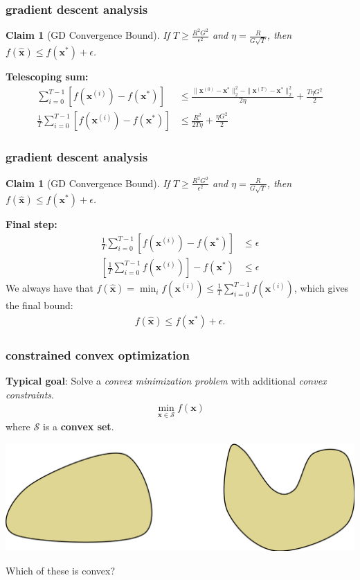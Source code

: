 \documentclass[compress]{beamer}
\newcommand{\bv}[1]{\mathbf{#1}}
\newtheorem{claim}[theorem]{Claim}
\begin{document}
\begin{frame}[t]
	\frametitle{gradient descent analysis}
	\small
	\begin{claim}[GD Convergence Bound]
	If $T \geq \frac{R^2G^2}{\epsilon^2}$ and $\eta = \frac{R}{G\sqrt{T}}$, then $f(\bv{\hat{x}}) \leq f(\bv{x}^*) + \epsilon$.
	\end{claim}
\textbf{Telescoping sum:}
\begin{align*}
	\sum_{i=0}^{T-1}\left[f(\bv{x}^{(i)}) - f(\bv{x}^*)\right] &\leq \frac{\|\bv{x}^{(0)} - \bv{x}^*\|_2^2 - \|\bv{x}^{(T)} - \bv{x}^*\|_2^2}{2\eta} + \frac{T\eta G^2}{2}\\
	\frac{1}{T}\sum_{i=0}^{T-1}\left[f(\bv{x}^{(i)}) - f(\bv{x}^*)\right] &\leq \frac{R^2}{2T\eta} + \frac{\eta G^2}{2}
\end{align*}
\end{frame}
\begin{frame}[t]
	\frametitle{gradient descent analysis}
	\begin{claim}[GD Convergence Bound]
		If $T \geq \frac{R^2G^2}{\epsilon^2}$ and $\eta = \frac{R}{G\sqrt{T}}$, then $f(\hat{\bv{x}}) \leq f(\bv{x}^*) + \epsilon$.
	\end{claim}
	\textbf{Final step:}
	\begin{align*}
		\frac{1}{T}\sum_{i=0}^{T-1}\left[f(\bv{x}^{(i)}) - f(\bv{x}^*)\right] &\leq \epsilon \\ 
		\left[\frac{1}{T}\sum_{i=0}^{T-1}f(\bv{x}^{(i)})\right] - f(\bv{x}^*) &\leq \epsilon 
	\end{align*}
We always have that $f(\hat{\bv{x}}) = \min_i f(\bv{x}^{(i)}) \leq \frac{1}{T}\sum_{i=0}^{T-1}f(\bv{x}^{(i)})$, which gives the final bound:
\begin{align*}
	f(\hat{\bv{x}}) \leq f(\bv{x}^*) + \epsilon. 
\end{align*}
\end{frame}

\begin{frame}[t]
	\frametitle{constrained convex optimization}
	\textbf{Typical goal}: Solve a \emph{convex minimization problem} with additional \emph{convex constraints}.  
	\begin{align*}
		\min_{\bv{x}\in \mathcal{S}} f(\bv{x})
	\end{align*}
where $\mathcal{S}$ is a \textbf{\alert{convex set}}. 
\begin{center}
	\includegraphics[width=.7\textwidth]{sets.png}
	
	Which of these is convex?
\end{center}
\end{frame}
\end{document}
